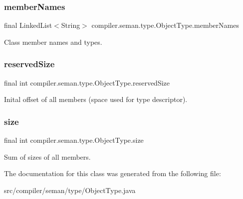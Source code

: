 \subsubsection{\texorpdfstring{member\+Names}{memberNames}}
{\footnotesize\ttfamily final Linked\+List$<$String$>$ compiler.\+seman.\+type.\+Object\+Type.\+member\+Names\hspace{0.3cm}{\ttfamily [protected]}}

Class member names and types. \mbox{\label{classcompiler_1_1seman_1_1type_1_1_object_type_a0cb8b416f51705d73146b0b329593d94}} 
\subsubsection{\texorpdfstring{reserved\+Size}{reservedSize}}
{\footnotesize\ttfamily final int compiler.\+seman.\+type.\+Object\+Type.\+reserved\+Size\hspace{0.3cm}{\ttfamily [protected]}}

Inital offset of all members (space used for type descriptor). \mbox{\label{classcompiler_1_1seman_1_1type_1_1_object_type_a4ad19055251d02b02789f40b2101267a}} 
\subsubsection{\texorpdfstring{size}{size}}
{\footnotesize\ttfamily final int compiler.\+seman.\+type.\+Object\+Type.\+size\hspace{0.3cm}{\ttfamily [protected]}}

Sum of sizes of all members. 

The documentation for this class was generated from the following file\+:\begin{DoxyCompactItemize}
\item 
src/compiler/seman/type/Object\+Type.\+java\end{DoxyCompactItemize}

